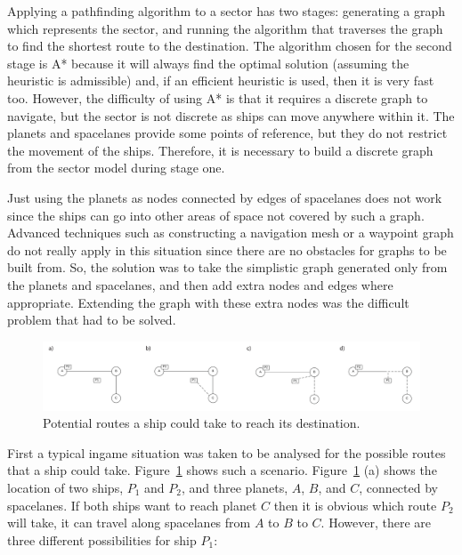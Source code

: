 Applying a pathfinding algorithm to a sector has two stages: generating a graph which represents the sector, and running the algorithm that traverses the graph to find the shortest route to the destination. The algorithm chosen for the second stage is A* because it will always find the optimal solution (assuming the heuristic is admissible) and, if an efficient heuristic is used, then it is very fast too. However, the difficulty of using A* is that it requires a discrete graph to navigate, but the sector is not discrete as ships can move anywhere within it. The planets and spacelanes provide some points of reference, but they do not restrict the movement of the ships. Therefore, it is necessary to build a discrete graph from the sector model during stage one.

Just using the planets as nodes connected by edges of spacelanes does not work since the ships can go into other areas of space not covered by such a graph. Advanced techniques such as constructing a navigation mesh or a waypoint graph do not really apply in this situation since there are no obstacles for graphs to be built from. So, the solution was to take the simplistic graph generated only from the planets and spacelanes, and then add extra nodes and edges where appropriate. Extending the graph with these extra nodes was the difficult problem that had to be solved.

\begin{figure}[h!]
	\includegraphics{res/pathfinding/PathFindingExample.pdf}
	\caption[Potential ship routes]{Potential routes a ship could take to reach its destination.}
	\label{fig:pathfindingexample}
\end{figure}

First a typical ingame situation was taken to be analysed for the possible routes that a ship could take. Figure~\ref{fig:pathfindingexample} shows such a scenario. Figure~\ref{fig:pathfindingexample} (a) shows the location of two ships, $P_1$ and $P_2$, and three planets, $A$, $B$, and $C$, connected by spacelanes. If both ships want to reach planet $C$ then it is obvious which route $P_2$ will take, it can travel along spacelanes from $A$ to $B$ to $C$. However, there are three different possibilities for ship $P_1$:


